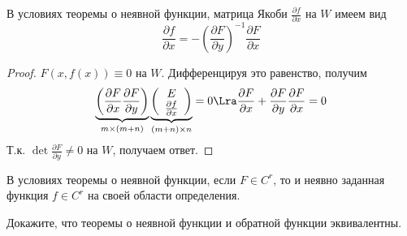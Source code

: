 \begin{corollary}
    В условиях теоремы о неявной функции, матрица Якоби \(\frac{\partial f}{\partial x}\) на \(W\) имеем вид 
    \[\frac{\partial f}{\partial x} = -\left( \frac{\partial F}{\partial y} \right)^{-1}\frac{\partial F}{\partial x}\]
\end{corollary}
\begin{proof}
    \(F(x, f(x)) \equiv 0\) на \(W\). Дифференцируя это равенство, получим
    \[\underbrace{\left( \frac{\partial F}{\partial x} \frac{\partial F}{\partial y} \right)}_{m \times (m + n)} \underbrace{\left( \begin{array}{c}
        E \\
        \frac{\partial f}{\partial x}
    \end{array} \right)}_{(m + n) \times n} = 0 \Lra \frac{\partial F}{\partial x} + \frac{\partial F}{\partial y}\frac{\partial F}{\partial x} = 0\]
    Т.к. \(\det \frac{\partial F}{\partial y} \ne 0\) на \(W\), получаем ответ.
\end{proof}

\begin{note}
    В условиях теоремы о неявной функции, если \(F \in C^r\), то и неявно заданная функция \(f \in C^r\) на своей области определения.
\end{note}

\begin{problem}
    Докажите, что теоремы о неявной функции и обратной функции эквивалентны.
\end{problem}
